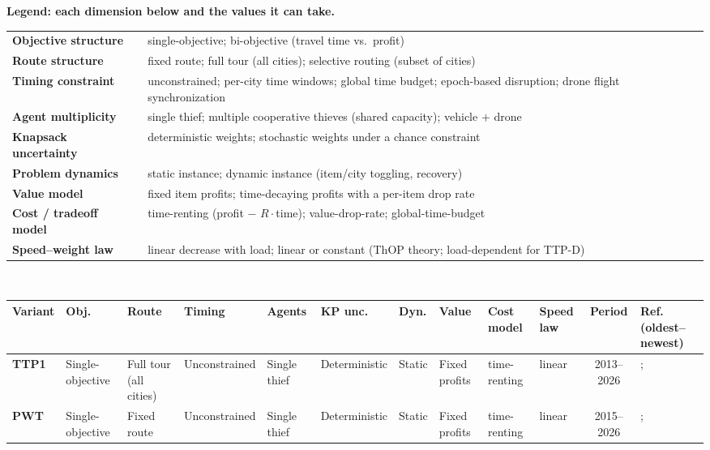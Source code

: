 \begin{center}
\footnotesize
{}
\label{tab:taxonomy}
\begin{flushleft}
\textbf{Legend: each dimension below and the values it can take.}
\end{flushleft}
\begin{tabular}{@{}p{3.0cm}p{16.3cm}@{}}
\textbf{Objective structure} & single-objective; bi-objective (travel time vs.\ profit)\\
\textbf{Route structure} & fixed route; full tour (all cities); selective routing (subset of cities)\\
\textbf{Timing constraint} & unconstrained; per-city time windows; global time budget; epoch-based disruption; drone flight synchronization\\
\textbf{Agent multiplicity} & single thief; multiple cooperative thieves (shared capacity); vehicle $+$ drone\\
\textbf{Knapsack uncertainty} & deterministic weights; stochastic weights under a chance constraint\\
\textbf{Problem dynamics} & static instance; dynamic instance (item/city toggling, recovery)\\
\textbf{Value model} & fixed item profits; time-decaying profits with a per-item drop rate\\
\textbf{Cost / tradeoff model} & time-renting (profit $-$ $R\cdot$time); value-drop-rate; global-time-budget\\
\textbf{Speed--weight law} & linear decrease with load; linear or constant (ThOP theory; load-dependent for TTP-D)\\
\end{tabular}\\[6pt]
\centering
\setlength{\tabcolsep}{3pt}
\begin{tabular}{@{}lp{1.35cm}p{1.35cm}p{2.5cm}p{2.5cm}p{2.5cm}p{1.0cm}p{1.35cm}p{1.55cm}p{1.55cm}cp{2.0cm}@{}}
\toprule
\textbf{Variant} & \textbf{Obj.} & \textbf{Route} & \textbf{Timing} & \textbf{Agents} & \textbf{KP unc.} & \textbf{Dyn.} & \textbf{Value} & \textbf{Cost model} & \textbf{Speed law} & \textbf{Period} & \textbf{Ref. (oldest--newest)} \\
\midrule
\textbf{TTP1} & Single-objective & Full tour (all cities) & Unconstrained & Single thief & Deterministic & Static & Fixed profits & time-renting & linear & 2013--2026 & \citet{bonyadi2013travelling}; \citet{eube2026approximation} \\
\textbf{PWT} & Single-objective & Fixed route & Unconstrained & Single thief & Deterministic & Static & Fixed profits & time-renting & linear & 2015--2026 & \citet{polyakovskiy2015packing}; \citet{don2026greedy} \\

\end{tabular}
\end{center}
